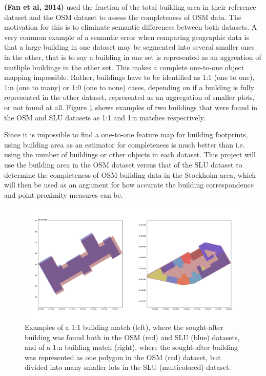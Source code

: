 \documentclass{kththesis}
\begin{document}
\textbf{(Fan et al, 2014)} used the fraction of the total building area in their reference dataset and the OSM dataset to assess the completeness of OSM data.
The motivation for this is to eliminate semantic differences between both datasets.
A very common example of a semantic error when comparing geographic data is that a large building in one dataset may be segmented into several smaller ones in the other, that is to say a building in one set is represented as an aggreation of mutliple buildings in the other set.
This makes a complete one-to-one object mapping impossible.
Rather, buildings have to be identified as 1:1 (one to one), 1:n (one to many) or 1:0 (one to none) cases, depending on if a building is fully represented in the other dataset, represented as an aggregation of smaller plots, or not found at all.
Figure \ref{fig:building-match-types} shows examples of two buildings that were found in the OSM and SLU datasets as 1:1 and 1:n matches respectively.

Since it is impossible to find a one-to-one feature map for building footprints, using building area as an estimator for completeness is much better than i.e. using the number of buildings or other objects in each dataset.
This project will use the building area in the OSM dataset versus that of the SLU dataset to determine the completeness of OSM building data in the Stockholm area, which will then be used as an argument for how accurate the building correspondence and point proximity measures can be.

\begin{figure}[H]
    \centering
    \includegraphics[width=\textwidth,height=0.5\textheight,keepaspectratio]{img_building_match}
    \caption{Examples of a 1:1 building match (left), where the sought-after building was found both in the OSM (red) and SLU (blue) datasets, and of a 1:n building match (right), where the sought-after building was represented as one polygon in the OSM (red) dataset, but divided into many smaller lots in the SLU (multicolored) dataset.}
    \label{fig:building-match-types}
\end{figure}
\end{document}
